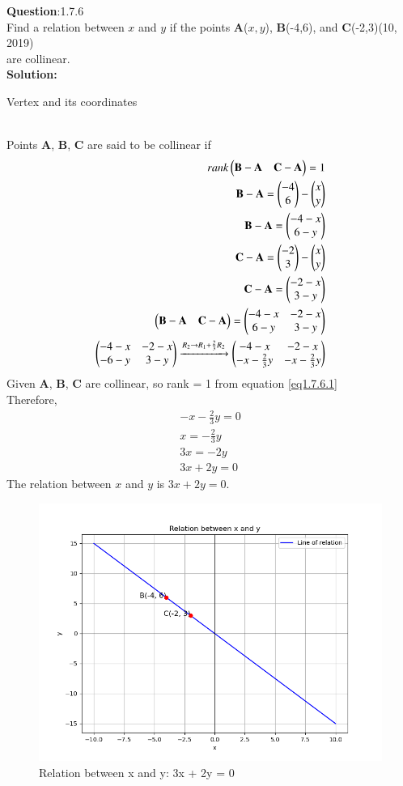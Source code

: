 \documentclass[journal]{IEEEtran}
\begin{document}
\textbf{Question}:1.7.6\\
Find a relation between $x$ and $y$ if the points \textbf{A}($x,y$), \textbf{B}(-4,6), and  \textbf{C}(-2,3)\hfill(10, 2019)\\ are collinear.
\\
\textbf{Solution:}
\renewcommand{\tablename}{Table 1.7.6.1}
\begin{table}[h!]
  \centering
  
  \caption{Vertex and its coordinates}
\end{table}
\\
 Points \textbf{A}, \textbf{B}, \textbf{C} are said to be collinear if
 \begin{align}
rank\begin{pmatrix}\textbf{B} - \textbf{A} & \textbf{C} - \textbf{A}\end{pmatrix} = 1 \label{eq1.7.6.1} \\
     \textbf{B} - \textbf{A} = \begin{pmatrix}-4 \\ 6\end{pmatrix} - \begin{pmatrix}x \\ y\end{pmatrix} \\
     \textbf{B} - \textbf{A} = \begin{pmatrix}-4 - x \\ 6 - y\end{pmatrix} \\
     \textbf{C} - \textbf{A} = \begin{pmatrix}-2 \\ 3\end{pmatrix} - \begin{pmatrix}x \\ y\end{pmatrix} \\
     \textbf{C} - \textbf{A} = \begin{pmatrix}-2 - x \\ 3 - y\end{pmatrix} \\
     \begin{pmatrix}\textbf{B} - \textbf{A} & \textbf{C} - \textbf{A}\end{pmatrix} = \begin{pmatrix}-4 - x & -2 - x \\ 6 - y & 3 - y\end{pmatrix} \\
     \begin{pmatrix}-4 - x & -2 - x \\ -6 - y & 3 - y\end{pmatrix} \xrightarrow[]{R_2 \rightarrow R_1+\frac{2}{3}R_2} \begin{pmatrix}-4 - x & -2 - x \\ -x - \frac{2}{3}y & -x - \frac{2}{3}y\end{pmatrix} \\
     \end{align}
Given \textbf{A}, \textbf{B}, \textbf{C} are collinear, so rank = 1 from equation \ref{eq1.7.6.1} \\
Therefore,
\begin{align}
    -x - \frac{2}{3}y = 0 \\
    x = - \frac{2}{3}y \\
    3x = -2y \\
    3x + 2y = 0
\end{align}
The relation between $x$ and $y$ is $3x + 2y = 0$.
\begin{figure}[h!]
   \centering
   \includegraphics[width=0.7\linewidth]{figs/collinear.png}
   \caption{Relation between x and y: 3x + 2y = 0}
   \end{figure}
   
\end{document}
